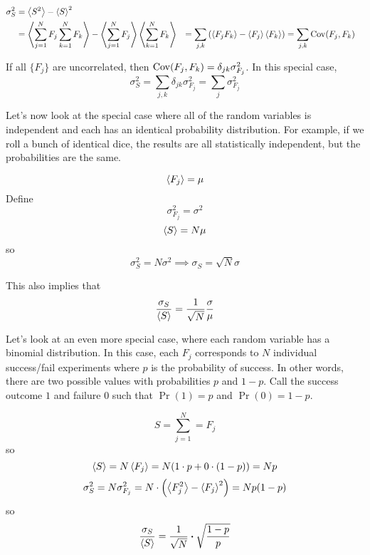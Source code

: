 \documentclass[a4paper,twoside,master.tex]{subfiles}
\begin{document}
\begin{align}
    \sigma^2_S &= \ev{S^2} - \ev{S}^2 \\
    &= \ev{\sum_{j=1}^{N} F_j \sum_{k=1}^{N} F_k} - \ev{\sum_{j=1}^{N} F_j} \ev{\sum_{k=1}^{N} F_k}
    &= \sum_{j,k} \left(\ev{F_j F_k} - \ev{F_j} \ev{F_k}\right)
    &= \sum_{j,k} \Cov(F_j, F_k)
\end{align}

If all $ \{F_j\} $ are uncorrelated, then $ \mathrm{Cov}(F_j, F_k) = \delta_{jk} \sigma_{F_j}^2 $. In this special case,
\begin{equation}
    \sigma^2_S = \sum_{j,k} \delta_{jk} \sigma_{F_j}^2 = \sum_j \sigma_{F_j}^2
\end{equation}

Let's now look at the special case where all of the random variables is independent and each has an identical probability distribution. For example, if we roll a bunch of identical dice, the results are all statistically independent, but the probabilities are the same.

\begin{equation}
    \ev{F_j} = \mu
\end{equation}
Define
\begin{equation}
    \sigma^2_{F_j} = \sigma^2
\end{equation}
\begin{equation}
    \ev{S} = N \mu
\end{equation}
so
\begin{equation}
    \sigma^2_S = N \sigma^2 \implies \sigma_S = \sqrt{N} \sigma
\end{equation}

This also implies that
\begin{equation}
    \frac{\sigma_S}{\ev{S}} = \frac{1}{\sqrt{N}} \frac{\sigma}{\mu}
\end{equation}

Let's look at an even more special case, where each random variable has a binomial distribution. In this case, each $ F_j $ corresponds to $ N $ individual success/fail experiments where $ p $ is the probability of success. In other words, there are two possible values with probabilities $ p $ and $ 1 - p $. Call the success outcome $ 1 $ and failure $ 0 $ such that $ \Pr(1) = p $ and $ \Pr(0) = 1 - p $.

\begin{equation}
    S = \sum_{j=1}^{N} = F_j
\end{equation}
so
\begin{equation}
    \ev{S} = N \ev{F_j} = N(1 \cdot p + 0 \cdot (1-p)) = Np
\end{equation}
\begin{equation}
    \sigma^2_S = N \sigma^2_{F_j} = N \cdot \left( \ev{F_j^2} - \ev{F_j}^2 \right) = Np(1-p)
\end{equation}
so
\begin{equation}
    \frac{\sigma_S}{\ev{S}} = \frac{1}{\sqrt{N}} \vdot \sqrt{\frac{1-p}{p}}
\end{equation}
\end{document}
